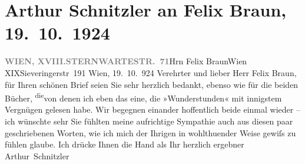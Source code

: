 

         
         \newcommand{\erwaehntePersonen}{Personen: Felix Braun}
         \newcommand{\erwaehnteOrte}{Orte: Sieveringer Straße, Sternwartestraße, Wien, XIX., Döbling, XVIII., Währing}
         \newcommand{\erwaehnteWerke}{Werke: Der unsichtbare Gast, Wunderstunden. Drei Erzählungen}
               \section[Arthur Schnitzler an Felix Braun, 19. 10. 1924]{ Arthur Schnitzler an Felix Braun, 19. 10. 1924}\nopagebreak{}\rehead{ }\begin{ledgroupsized}[t]{13cm}\normalsize\beginnumbering \toendnotes[C]{\smallbreak\pagebreak[2]} 
\toendnotes[C]{\smallbreak}\pstart{}{\pb}\label{T_L02416-1v}\label{T_L02416-1h}\pend{}\pstart{}\textcolor{gray}{\textbf{WIEN, XVIII.}}\pend{}\pstart{}\textcolor{gray}{\textbf{STERNWARTESTR. 71}}\pend{}{\bigskip}\pstart{}Hrn Felix Braun\pend{}\pstart{}Wien XIX\pend{}\pstart{}Sieveringerstr 191\pend{}{\bigskip}\pstart
           \raggedleft{}{\pb}Wien, 19. 10. 924\pend
           \pstart
           Verehrter und lieber Herr Felix Braun,  für Ihren schönen Brief
                    seien Sie sehr herzlich bedankt, ebenso wie für die beiden Bücher, \substVorne{}\textsuperscript{die}\substDazwischen{}von denen\substHinten{} ich eben das eine, die »Wunderstunden« mit innigstem Vergnügen gelesen habe. Wir begegnen einander
                    hoffentlich beide einmal wieder – ich wünschte sehr Sie fühlten meine
                    aufrichtige Sympathie auch aus diesen paar geschrie{\pb}benen Worten, wie ich mich der
                    Ihrigen in wohlthuender Weise gewiſs zu fühlen glaube. Ich drücke Ihnen die
                    Hand als Ihr herzlich ergebner\pend
           \pstart \spacefill\mbox{Arthur Schnitzler}\pend{}
         

\end{ledgroupsized}

